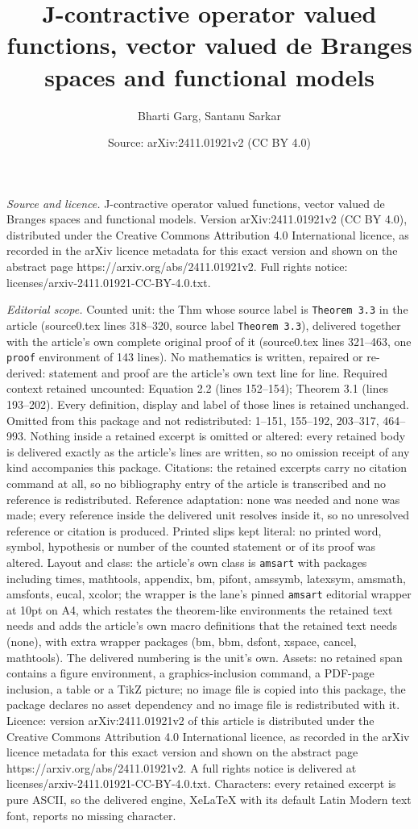 \documentclass[10pt,a4paper]{amsart}
\title[J-contractive operator valued functions, vector valued de Br]{J-contractive operator valued functions, vector valued de Branges spaces and functional models}
\author{Bharti Garg, Santanu Sarkar}
\date{Source: arXiv:2411.01921v2 (CC BY 4.0)}
\begin{document}
\maketitle

\noindent\emph{Source and licence.} J-contractive operator valued functions, vector valued de Branges spaces and functional models. Version arXiv:2411.01921v2 (CC BY 4.0), distributed under the Creative Commons Attribution 4.0 International licence, as recorded in the arXiv licence metadata for this exact version and shown on the abstract page https://arxiv.org/abs/2411.01921v2. Full rights notice: licenses/arxiv-2411.01921-CC-BY-4.0.txt.\par\smallskip

\noindent\textit{Editorial scope.} Counted unit: the Thm whose source label is \texttt{Theorem 3.3} in the article (source0.tex lines 318--320, source label \texttt{Theorem 3.3}), delivered together with the article's own complete original proof of it (source0.tex lines 321--463, one \texttt{proof} environment of 143 lines). No mathematics is written, repaired or re-derived: statement and proof are the article's own text line for line. Required context retained uncounted: Equation 2.2 (lines 152--154); Theorem 3.1 (lines 193--202). Every definition, display and label of those lines is retained unchanged. Omitted from this package and not redistributed: 1--151, 155--192, 203--317, 464--993. Nothing inside a retained excerpt is omitted or altered: every retained body is delivered exactly as the article's lines are written, so no omission receipt of any kind accompanies this package. Citations: the retained excerpts carry no citation command at all, so no bibliography entry of the article is transcribed and no reference is redistributed. Reference adaptation: none was needed and none was made; every reference inside the delivered unit resolves inside it, so no unresolved reference or citation is produced. Printed slips kept literal: no printed word, symbol, hypothesis or number of the counted statement or of its proof was altered. Layout and class: the article's own class is \texttt{amsart} with packages including times, mathtools, appendix, bm, pifont, amssymb, latexsym, amsmath, amsfonts, eucal, xcolor; the wrapper is the lane's pinned \texttt{amsart} editorial wrapper at 10pt on A4, which restates the theorem-like environments the retained text needs and adds the article's own macro definitions that the retained text needs (none), with extra wrapper packages (bm, bbm, dsfont, xspace, cancel, mathtools). The delivered numbering is the unit's own. Assets: no retained span contains a figure environment, a graphics-inclusion command, a PDF-page inclusion, a table or a TikZ picture; no image file is copied into this package, the package declares no asset dependency and no image file is redistributed with it. Licence: version arXiv:2411.01921v2 of this article is distributed under the Creative Commons Attribution 4.0 International licence, as recorded in the arXiv licence metadata for this exact version and shown on the abstract page https://arxiv.org/abs/2411.01921v2. A full rights notice is delivered at licenses/arxiv-2411.01921-CC-BY-4.0.txt. Characters: every retained excerpt is pure ASCII, so the delivered engine, XeLaTeX with its default Latin Modern text font, reports no missing character.
\end{document}
